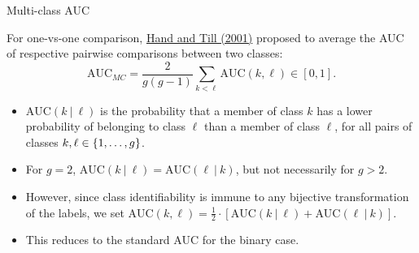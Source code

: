 \begin{vbframe}{Multi-class AUC}
\framebreak
  

  \small
For one-vs-one comparison,
  \href{https://link.springer.com/article/10.1023/A:1010920819831}
  {Hand and Till (2001)} proposed to average the AUC of respective pairwise 
  comparisons between two classes:
  $$\text{AUC}_{MC} = \frac{2}{g(g - 1)} \sum_{k < \ell} \text{AUC}(k, \ell) 
    \in [0, 1].$$
  \begin{itemize}
    \small
    \item $\text{AUC}(k ~|~ \ell)$ is the 
    probability that a member of class $k$ 
    has a lower probability of belonging to class $\ell$ than a member of class $\ell$, for all pairs of classes $k, \ell \in \{1, \ldots, g\}$.
    \item For $g = 2$, $\text{AUC}(k ~|~ \ell) = 
    \text{AUC}(\ell ~|~ k)$, but not necessarily for $g > 2$.
    \item However, since class identifiability is immune to any bijective 
    transformation of the labels, %
    we set $\text{AUC}(k, \ell) = \frac{1}{2} \cdot [\text{AUC}(k ~|~ \ell) + 
    \text{AUC}(\ell ~|~ k)]$.
  
  
    \item This reduces to the standard AUC for the binary case.
  \end{itemize}

\end{vbframe}


\endlecture

